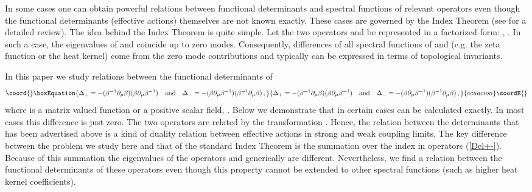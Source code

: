 \documentclass[a4paper,12pt]{article}
\begin{document}
In some cases one can obtain powerful relations between
functional determinants and spectral functions of relevant
operators even though the functional determinants (effective
actions) themselves are not known exactly. 
These cases are governed by the Index Theorem (see 
\cite{Gilkey95,EGH} for a detailed review).
The idea behind the Index Theorem is quite
simple. Let the two operators \coordHE{} and \coordHE{}
be represented in a factorized form: \coordHE{},
\coordHE{}. In such a case, the eigenvalues of 
\coordHE{} and \coordHE{} coincide up to zero modes.
Consequently, differences of all spectral functions
of \coordHE{} and \coordHE{} (e.g. the zeta function or
the heat kernel) come from  the zero mode contributions
and typically can be expressed in terms of topological invariants.

In this paper we study relations between the functional
determinants of
\begin{equation}\coord{}\boxEquation{
\Delta_+=-(\beta^{-1}\partial_\mu \beta )
(\beta \partial_\mu \beta^{-1})\quad {\rm and}\quad
\Delta_-=-(\beta \partial_\mu \beta^{-1})
(\beta^{-1}\partial_\mu \beta )\,, \label{Del+-}
}{
\Delta_+=-(\beta^{-1}\partial_\mu \beta )
(\beta \partial_\mu \beta^{-1})\quad {\rm and}\quad
\Delta_-=-(\beta \partial_\mu \beta^{-1})
(\beta^{-1}\partial_\mu \beta )\,, }{ecuacion}\coordE{}\end{equation}
where \coordHE{} is a matrix valued function or a
positive scalar field, \coordHE{}. Below we
demonstrate that in certain cases \myHighlight{$\log \det \Delta_+-
\log \det \Delta_-$}\coordHE{} can be calculated exactly. In
most cases this difference is just zero.
The two operators are related by the transformation 
\coordHE{}.
Hence, the relation between the determinants that has been
advertised above is a kind of duality relation between
effective actions in strong and weak coupling limits.
The key difference between the problem we study here and  
that of the standard Index Theorem is
the summation over the index \myHighlight{$\mu$}\coordHE{} in operators (\ref{Del+-}).
Because of this summation the eigenvalues of the operators 
\myHighlight{$\Delta_+$}\coordHE{} and \myHighlight{$\Delta_-$}\coordHE{} generically are different. 
Nevertheless, we find a relation between
the functional determinants of these operators even though
this property cannot be extended to other
spectral functions (such as higher heat kernel
coefficients). 
\end{document}
